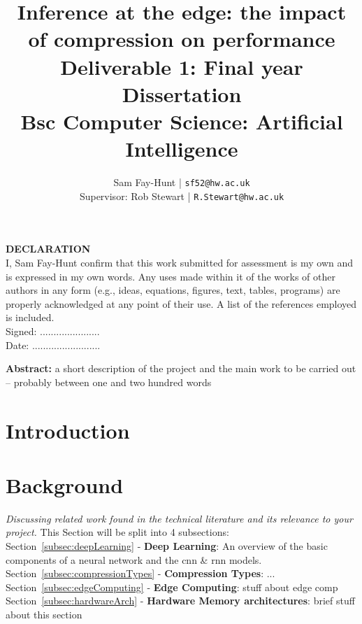 \documentclass[11pt]{article}
\begin{document}
\title{%
	\bf Inference at the edge: the impact of compression on performance\\ 
	\large Deliverable 1: Final year Dissertation \\
	Bsc Computer Science: Artificial Intelligence}

\author{
	Sam Fay-Hunt | \texttt{sf52@hw.ac.uk}\\
	Supervisor: Rob Stewart | \texttt{R.Stewart@hw.ac.uk}
}

\maketitle
\thispagestyle{empty}
\pagebreak

\textbf{DECLARATION}\\
I, Sam Fay-Hunt confirm that this work submitted for assessment is my own and is expressed in
my own words. Any uses made within it of the works of other authors in any form (e.g., ideas,
equations, figures, text, tables, programs) are properly acknowledged at any point of their
use. A list of the references employed is included.\\
Signed: ......................\\
Date: .........................
\thispagestyle{empty}
\pagebreak

\textbf{Abstract:} a short description of the project and the main work to be carried out – probably
between one and two hundred words
\thispagestyle{empty}
\pagebreak

\tableofcontents
\thispagestyle{empty}
\pagebreak


\setcounter{page}{1}

\section{Introduction}


\pagebreak
\section{Background}
\emph{Discussing related work found in the technical literature and its relevance to your project.}
This Section will be split into 4 subsections:\\
Section~\ref{subsec:deepLearning} - \textbf{Deep Learning}: An overview of the basic components of a neural network and the \acrshort{cnn} \& \acrshort{rnn} models.\\
Section~\ref{subsec:compressionTypes} - \textbf{Compression Types}: ...\\
Section~\ref{subsec:edgeComputing} - \textbf{Edge Computing}: stuff about edge comp\\
Section~\ref{subsec:hardwareArch} - \textbf{Hardware Memory architectures}: brief stuff about this section
\end{document}
